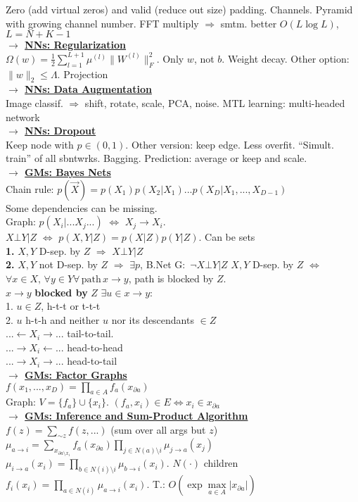 \documentclass[12pt]{article}
\newcommand{\mytitle}[1]{ {\bf $\rightarrow$ \underline{#1}}\\}
\begin{document}
\begin{multicols*}{2}
Zero (add virtual zeros) and valid (reduce out size) padding.
Channels. Pyramid with growing channel number.
FFT multiply $\Rightarrow$ smtm. better $O(L\log L)$, $L=N+K-1$\\
\mytitle{NNs: Regularization}
$\Omega(w)=\frac{1}{2}\sum\limits_{l=1}^{L+1}\mu^{(l)}\|W^{(l)}\|_F^2$.
Only $w$, not $b$. Weight decay.
Other option: $\|w\|_2\leqslant \Lambda$. Projection\\
\mytitle{NNs: Data Augmentation}
Image classif. $\Rightarrow$ shift, rotate, scale, PCA, noise.
MTL learning: multi-headed network\\
\mytitle{NNs: Dropout}
Keep node with $p\in(0,1)$. Other version: keep edge.
Less overfit. ``Simult. train'' of all sbntwrks. Bagging.
Prediction: average or keep and scale.\\
\mytitle{GMs: Bayes Nets}
Chain rule: $p(\vec{X})=p(X_1)p(X_2|X_1)...p(X_D|X_1,...,X_{D-1})$\\
Some dependencies can be missing.\\
Graph: $p(X_i|...X_j...)$ $\Leftrightarrow$ $X_j\to X_i$.\\
$X\bot Y|Z$ $\Leftrightarrow$ $p(X, Y|Z)=p(X|Z)p(Y|Z)$. Can be sets\\
{\bf 1.} $X, Y$ D-sep. by $Z$ $\Rightarrow$ $X\bot Y|Z$\\
{\bf 2.} $X, Y$ not D-sep. by $Z$ $\Rightarrow$ $\exists p$, B.Net G$\colon$ $\neg X\bot Y|Z$
$X,Y$ D-sep. by $Z$ $\Leftrightarrow$ $\forall x\in X,\,\forall y\in Y \forall\, \mbox{path}\, x\to y$, path is blocked by $Z$.\\$x\to y$ {\bf blocked by} $Z$ $\exists u\in x\to y\colon$\\
1. $u\in Z$, h-t-t or t-t-t\\
2. $u$ h-t-h and neither $u$ nor its descendants $\in Z$\\
$...\leftarrow X_i\rightarrow...$ tail-to-tail.\\
$...\rightarrow X_i\leftarrow...$ head-to-head\\
$...\rightarrow X_i\rightarrow...$ head-to-tail\\
\mytitle{GMs: Factor Graphs}
$f(x_1,...,x_D)=\prod\limits_{a\in A}f_a(x_{\partial a})$\\
Graph: $V=\{f_a\}\cup\{x_i\}$. $(f_a,x_i)\in E\Leftrightarrow x_i\in x_{\partial a}$\\
\mytitle{GMs: Inference and Sum-Product Algorithm}
$f(z)=\sum\limits_{\sim z}f(z,...)$ (sum over all args but $z$)\\
$\mu_{a\to i}=\sum\limits_{x_{\partial a\setminus x_i}}f_a(x_{\partial a})\prod\limits_{j\in N(a)\setminus i}\mu_{j\to a}(x_j)$\\
$\mu_{i\to a}(x_i)=\prod\limits_{b\in N(i)\setminus i}\mu_{b\to i}(x_i)$. $N(\cdot )$ children\\
$f_i(x_i)=\prod\limits_{a\in N(i)}\mu_{a\to i}(x_i)$.
T.: $O\left(\exp \max\limits_{a\in A}|x_{\partial a}|\right)$
\end{multicols*}
\end{document}
